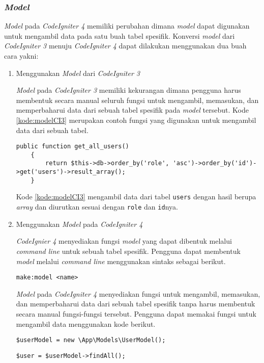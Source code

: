 \subsubsection{\textit{Model}}
\textit{Model} pada \textit{CodeIgniter 4} memiliki perubahan dimana \textit{model} dapat digunakan untuk mengambil data pada satu buah tabel spesifik. Konversi \textit{model} dari \textit{CodeIgniter 3} menuju \textit{CodeIgniter 4} dapat dilakukan menggunakan dua buah cara yakni:
\begin{enumerate}
\item Menggunakan \textit{Model} dari \textit{CodeIgniter 3}

\textit{Model} pada \textit{CodeIgniter 3} memiliki kekurangan dimana pengguna harus membentuk secara manual seluruh fungsi untuk mengambil, memasukan, dan memperbaharui data dari sebuah tabel spesifik pada \textit{model} tersebut. Kode \ref{kode:modelCI3} merupakan contoh fungsi yang digunakan untuk mengambil data dari sebuah tabel.
\begin{lstlisting}[caption=Contoh fungsi untuk mengambil data seluruh user, label=kode:modelCI3]
public function get_all_users()
	{
		return $this->db->order_by('role', 'asc')->order_by('id')->get('users')->result_array();
	}
\end{lstlisting}

Kode \ref{kode:modelCI3} mengambil data dari tabel \texttt{users} dengan hasil berupa \textit{array} dan diurutkan sesuai dengan \texttt{role} dan \texttt{id}nya.

\item Menggunakan \textit{Model} pada \textit{CodeIgniter 4}

\textit{CodeIgnier 4} menyediakan fungsi \textit{model} yang dapat dibentuk melalui \textit{command line} untuk sebuah tabel spesifik. Pengguna dapat membentuk \textit{model} melalui \textit{command line} menggunakan sintaks sebagai berikut.
\begin{center}
	\verb|make:model <name>|
\end{center}
\textit{Model} pada \textit{CodeIgniter 4} menyediakan fungsi untuk mengambil, memasukan, dan memperbaharui data dari sebuah tabel spesifik tanpa harus membentuk secara manual fungsi-fungsi tersebut. Pengguna dapat memakai fungsi untuk mengambil data menggunakan kode berikut.
\begin{center}
	\verb|$userModel = new \App\Models\UserModel();|
\end{center}
\begin{center}
	\verb|$user = $userModel->findAll();|
\end{center}
\end{enumerate}

